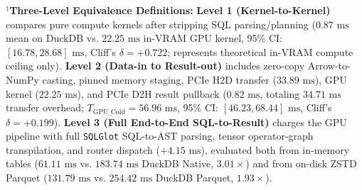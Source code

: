 \documentclass[10pt,a4paper]{article}
\begin{document}
\begin{table}[!t]
{\begin{tabular}{@{}lcccccccccc@{}}
\bottomrule
\end{tabular}%
}
\vspace{2pt}
\parbox{\textwidth}{\scriptsize $^{\dagger}$\textbf{Three-Level Equivalence Definitions:} \textbf{Level 1 (Kernel-to-Kernel)} compares pure compute kernels after stripping SQL parsing/planning ($0.87\text{ ms}$ mean on DuckDB vs. $22.25\text{ ms}$ in-VRAM GPU kernel, 95\% CI: $[16.78, 28.68]\text{ ms}$, Cliff's $\delta=+0.722$; represents theoretical in-VRAM compute ceiling only). \textbf{Level 2 (Data-in to Result-out)} includes zero-copy Arrow-to-NumPy casting, pinned memory staging, PCIe H2D transfer ($33.89\text{ ms}$), GPU kernel ($22.25\text{ ms}$), and PCIe D2H result pullback ($0.82\text{ ms}$, totaling $34.71\text{ ms}$ transfer overhead; $T_{\text{GPU\_Cold}}=56.96\text{ ms}$, 95\% CI: $[46.23, 68.44]\text{ ms}$, Cliff's $\delta=+0.199$). \textbf{Level 3 (Full End-to-End SQL-to-Result)} charges the GPU pipeline with full \texttt{SQLGlot} SQL-to-AST parsing, tensor operator-graph transpilation, and router dispatch ($+4.15\text{ ms}$), evaluated both from in-memory tables ($61.11\text{ ms}$ vs. $183.74\text{ ms}$ DuckDB Native, $3.01\times$) and from on-disk ZSTD Parquet ($131.79\text{ ms}$ vs. $254.42\text{ ms}$ DuckDB Parquet, $1.93\times$).}
\end{table}
\end{document}
